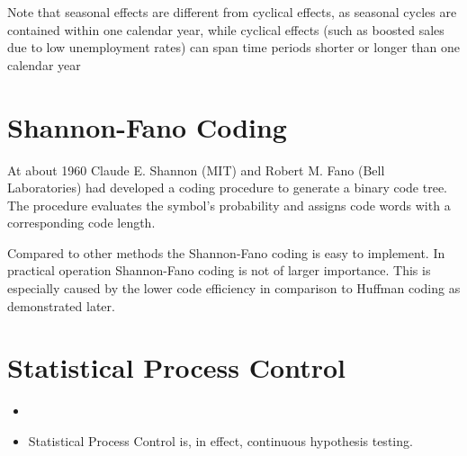 Note that seasonal effects are different from cyclical effects, as seasonal cycles are contained within one calendar year, while cyclical effects (such as boosted sales due to low unemployment rates) can span time periods shorter or longer than one calendar year


\section{Shannon-Fano Coding}

At about 1960 Claude E. Shannon (MIT) and Robert M. Fano (Bell Laboratories) had developed a coding procedure to generate a binary code tree. The procedure evaluates the symbol's probability and assigns code words with a corresponding code length.

Compared to other methods the Shannon-Fano coding is easy to implement. In practical operation Shannon-Fano coding is not of larger importance. This is especially caused by the lower code efficiency in comparison to Huffman coding as demonstrated later.




\section{Statistical Process Control}


\begin{itemize}
	\item
	\item Statistical Process Control is, in effect, continuous hypothesis testing.
\end{itemize}
%
%


%
%





